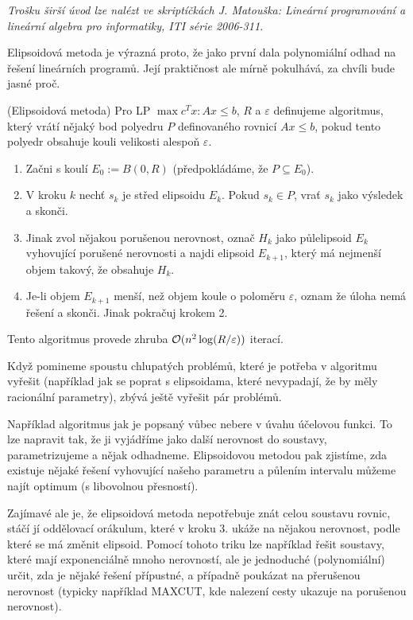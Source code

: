 {\it Trošku širší úvod lze nalézt ve skriptíčkách J. Matouška: Lineární
programování a lineární algebra pro informatiky, ITI série 2006-311.}

Elipsoidová metoda je výrazná proto, že jako první dala polynomiální odhad na
řešení lineárních programů. Její praktičnost ale mírně pokulhává, za chvíli bude
jasné proč.

\alg (Elipsoidová metoda) Pro LP $\max c^Tx: Ax \leq b$, $R$ a $\varepsilon$
definujeme algoritmus, který vrátí nějaký bod polyedru $P$ definovaného rovnicí $Ax \leq b$,
pokud tento polyedr obsahuje kouli velikosti alespoň $\varepsilon$.
\begin{enumerate}
	\item Začni s koulí $E_0 := B(0, R)$ (předpokládáme, že $P \subseteq E_0$).
	\item V kroku $k$ nechť $s_k$ je střed elipsoidu $E_k$. Pokud $s_k \in P$,
	vrať $s_k$ jako výsledek a skonči.
	\item Jinak zvol nějakou porušenou nerovnost, označ $H_k$ jako půlelipsoid
	$E_k$ vyhovující porušené nerovnosti a najdi elipsoid $E_{k+1}$, který má
	nejmenší objem takový, že obsahuje $H_k$.
	\item Je-li objem $E_{k+1}$ menší, než objem koule o poloměru $\varepsilon$,
	oznam že úloha nemá řešení a skonči. Jinak pokračuj krokem 2.
\end{enumerate}
Tento algoritmus provede zhruba $\mathcal{O}(n^2\log (R/\varepsilon))$ iterací.

Když pomineme spoustu chlupatých problémů, které je potřeba v algoritmu vyřešit
(například jak se poprat s elipsoidama, které nevypadají, že by měly racionální
parametry), zbývá ještě vyřešit pár problémů.

Například algoritmus jak je popsaný vůbec nebere v úvahu účelovou funkci. To lze
napravit tak, že ji vyjádříme jako další nerovnost do soustavy, parametrizujeme
a nějak odhadneme. Elipsoidovou metodou pak zjistíme, zda existuje nějaké řešení
vyhovující našeho parametru a půlením intervalu můžeme najít optimum (s
libovolnou přesností).

Zajímavé ale je, že elipsoidová metoda nepotřebuje znát celou soustavu rovnic,
stáčí jí oddělovací orákulum, které v kroku 3. ukáže na nějakou nerovnost, podle
které se má změnit elipsoid. Pomocí tohoto triku lze například řešit soustavy,
které mají exponenciálně mnoho nerovností, ale je jednoduché (polynomiální)
určit, zda je nějaké řešení přípustné, a případně poukázat na přerušenou
nerovnost (typicky například MAXCUT, kde nalezení cesty ukazuje na porušenou
nerovnost).
